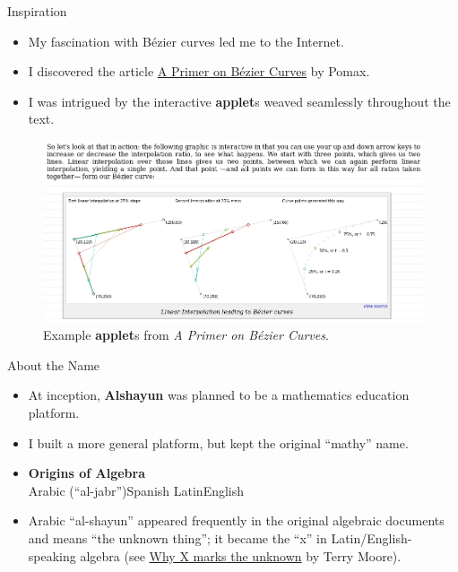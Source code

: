 \documentclass{beamer}
\begin{document}
\begin{frame}{Inspiration}
    \begin{itemize}
        \item My fascination with Bézier curves led me to the Internet.
        \item I discovered the article
            \href{https://pomax.github.io/bezierinfo/}{A Primer on Bézier
            Curves} by Pomax.
        \item I was intrigued by the interactive \textbf{applet}s weaved
            seamlessly throughout the text.
    \end{itemize}
    \begin{figure}
        \begin{center}
            \includegraphics[scale=0.25]{images/pomax.png}
        \end{center}
        \caption{Example \textbf{applet}s from \textit{A Primer on Bézier
        Curves}.}
    \end{figure}
\end{frame}

\begin{frame}{About the Name}
    \begin{itemize}
        \item At inception, \textbf{Alshayun} was planned to be a mathematics
            education platform.
        \item I built a more general platform, but kept the original ``mathy'' name.
        \item
            \begin{center}
                \textbf{Origins of Algebra} \\
                Arabic (``al-jabr'')\textrightarrow Spanish\textrightarrow
                Latin\textrightarrow English
            \end{center}
        \item Arabic ``al-shayun'' appeared frequently in the original algebraic
            documents and means ``the unknown thing''; it became the ``x'' in
            Latin/English-speaking algebra (see
            \href{https://cosmosmagazine.com/mathematics/why-x-marks-unknown-0}{Why
            X marks the unknown} by Terry Moore).
    \end{itemize}
\end{frame}
\end{document}
